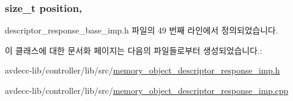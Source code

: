 \subsubsection[{\texorpdfstring{position}{position}}]{\setlength{\rightskip}{0pt plus 5cm}size\+\_\+t position\hspace{0.3cm}{\ttfamily [protected]}, {\ttfamily [inherited]}}\hypertarget{classavdecc__lib_1_1descriptor__response__base__imp_a7a04afe5347934be732ec70a70bd0a28}{}\label{classavdecc__lib_1_1descriptor__response__base__imp_a7a04afe5347934be732ec70a70bd0a28}


descriptor\+\_\+response\+\_\+base\+\_\+imp.\+h 파일의 49 번째 라인에서 정의되었습니다.



이 클래스에 대한 문서화 페이지는 다음의 파일들로부터 생성되었습니다.\+:\begin{DoxyCompactItemize}
\item 
avdecc-\/lib/controller/lib/src/\hyperlink{memory__object__descriptor__response__imp_8h}{memory\+\_\+object\+\_\+descriptor\+\_\+response\+\_\+imp.\+h}\item 
avdecc-\/lib/controller/lib/src/\hyperlink{memory__object__descriptor__response__imp_8cpp}{memory\+\_\+object\+\_\+descriptor\+\_\+response\+\_\+imp.\+cpp}\end{DoxyCompactItemize}
